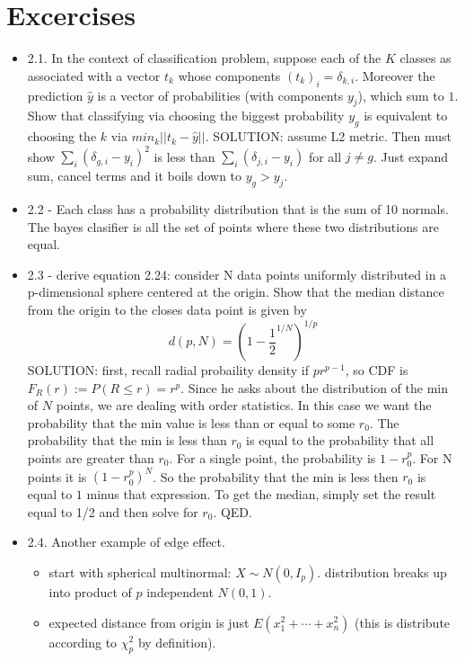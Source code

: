 \section{Excercises}
\begin{itemize}
  \item 2.1. In the context of classification problem, suppose each of the $K$ classes as associated with a vector $t_k$ whose components $(t_k)_i = \delta_{k,i}$. Moreover the prediction $\hat{y}$ is a vector of probabilities (with components $y_j$), which sum to $1$. Show that classifying via choosing the biggest probability $y_g$ is equivalent to choosing the $k$ via $min_k || t_k - \hat{y} ||$.
    \subitem SOLUTION: assume L2 metric. Then must show $\sum_i (\delta_{g,i} - y_i)^2$ is less than $\sum_i (\delta_{j,i} - y_i)$ for all $j \neq g$. Just expand sum, cancel terms and it boils down to $y_g > y_j$.
  \item 2.2 - Each class has a probability distribution that is the sum of 10 normals. The bayes clasifier is all the set of points where these two distributions are equal.
  \item 2.3 - derive equation 2.24: consider N data points uniformly distributed in a p-dimensional sphere centered at the origin. Show that the median distance from the origin to the closes data point is given by
    $$ d(p, N) = \left(1 - \frac{1}{2}^{1/N}\right)^{1/p} $$
    \subitem SOLUTION: first, recall radial probaility density if $pr^{p-1}$, so CDF is $F_R(r) := P(R \leq r) = r^p$. Since he asks about the distribution of the min of $N$ points, we are dealing with order statistics. In this case we want the probability that the min value is less than or equal to some $r_0$. 
    The probability that the min is less than $r_0$ is equal to the probability that all points are greater than $r_0$.
    For a single point, the probability is $1-r_0^p$. For N points it is $(1-r_0^p)^N$. 
    So the probability that the min is less then $r_0$ is equal to $1$ minus that expression. To get the median, simply set the result equal to 1/2 and then solve for $r_0$. QED.
  \item 2.4. Another example of edge effect.
    \begin{itemize}
      \item start with spherical multinormal: $X \sim N(0, I_p)$.  distribution breaks up into product of $p$ independent $N(0,1)$.
      \item expected distance from origin is just $E(x_1^2 + \cdots +x_n^2)$ (this is distribute according to $\chi_p^2$ by definition).

\end{itemize}
\end{itemize}
